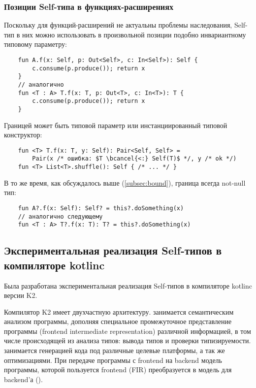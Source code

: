 \subsubsection{Позиции Self-типа в функциях-расширениях} \label{subsubsec:extension-position}

Поскольку для функций-расширений не актуальны проблемы наследования, Self-тип в них можно использовать в произвольной позиции подобно инвариантному типовому параметру:

\begin{verbatim}
    fun A.f(x: Self, p: Out<Self>, c: In<Self>): Self {
        c.consume(p.produce()); return x
    }
    // аналогично
    fun <T : A> T.f(x: T, p: Out<T>, c: In<T>): T {
        c.consume(p.produce()); return x
    }
\end{verbatim}

Границей может быть типовой параметр или инстанциированный типовой конструктор:

\begin{verbatim}
    fun <T> T.f(x: T, y: Self): Pair<Self, Self> =
        Pair(x /* ошибка: $T \bcancel{<:} Self(T)$ */, y /* ok */)
    fun <T> List<T>.shuffle(): Self { /* ... */ }
\end{verbatim}

В то же время, как обсуждалось выше (\ref{subsec:bound}), граница всегда not-null тип:

\begin{verbatim}
    fun A?.f(x: Self): Self? = this?.doSomething(x)
    // аналогично следующему
    fun <T : A> T?.f(x: T): T? = this?.doSomething(x)
\end{verbatim}


\subsection{Экспериментальная реализация Self-типов в компиляторе kotlinc}

Была разработана экспериментальная реализация Self-типов в компиляторе kotlinc версии K2.

Компилятор K2 имеет двухчастную архитектуру.
 занимается семантическим анализом программы, дополняя специальное промежуточное представление программы  (frontend intermediate representation) различной информацией, в том числе происходящей из анализа типов: вывода типов и проверки типизируемости.
 занимается генерацией кода под различные целевые платформы, а так же оптимизациями.
При передаче программы с frontend на backend модель программы, которой пользуется frontend (FIR) преобразуется в модель для backend'а ().

